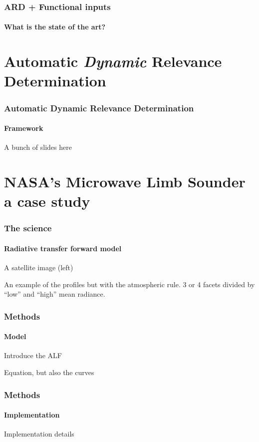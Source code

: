 \documentclass{snedecorbeamer}
\begin{document}
\begin{frame}[c]
  \frametitle{ARD + Functional inputs}
  \framesubtitle{What is the state of the art?}

  

\end{frame}

\section{Automatic \textit{Dynamic} Relevance Determination}

\begin{frame}
  \frametitle{Automatic Dynamic Relevance Determination}
  \framesubtitle{Framework}

  A bunch of slides here
\end{frame}

\section{NASA's Microwave Limb Sounder \\ {\small a case study}}

\begin{frame}
  \frametitle{The science}
  \framesubtitle{Radiative transfer forward model }

  A satellite image (left)

  An example of the profiles but with the atmospheric rule. 3 or 4 facets
  divided by ``low'' and ``high'' mean radiance.
\end{frame}

\begin{frame}
  \frametitle{Methods}
  \framesubtitle{Model}

  Introduce the ALF

  Equation, but also the curves
\end{frame}

\begin{frame}
  \frametitle{Methods}
  \framesubtitle{Implementation}

  Implementation details
\end{frame}
\end{document}
